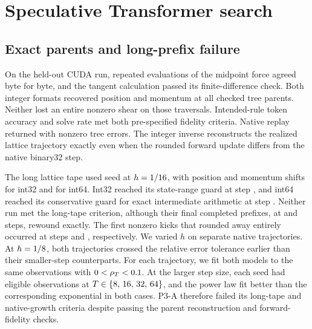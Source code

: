 \section{Speculative Transformer search}
\label{sec:search}

\subsection{Exact parents and long-prefix failure}

On the held-out CUDA run, repeated evaluations of the midpoint
force agreed byte for byte, and the tangent calculation passed
its finite-difference check. Both integer formats recovered
position and momentum at all \PthreeParents{} checked tree
parents. Neither lost an entire nonzero shear on those traversals.
Intended-rule token accuracy and solve rate met both pre-specified
fidelity criteria. Native replay returned with nonzero tree
errors. The integer inverse reconstructs the realized lattice
trajectory exactly even when the rounded forward update differs
from the native binary32 step.

The long lattice tape used seed \PthreeLongSeed{} at
\(h=1/16{}\), with position and momentum shifts
\PthreeIntLowShifts{} for int32 and \PthreeIntHighShifts{} for
int64. Int32 reached its state-range guard at step
\PthreeIntLowGuard{}, and int64 reached its conservative guard
for exact intermediate arithmetic at step \PthreeIntHighGuard{}.
Neither run met the long-tape criterion, although their final
completed prefixes, at \PthreeIntLowPrefix{} and
\PthreeIntHighPrefix{} steps, rewound exactly. The first nonzero
kicks that rounded away entirely occurred at
steps \PthreeIntLowKick{} and \PthreeIntHighKick{}, respectively.
We varied \(h\) on separate native trajectories. At
\(h=1/8{}\), both trajectories crossed the relative
error tolerance \PthreeNativeThreshold{} earlier than their
smaller-step counterparts. For each trajectory, we fit both
models to the same observations with
\(0<\rho_T<\PthreeFitErrorUpper{}\). At the larger step size,
each seed had \PthreeHighFitN{} eligible observations at
\(T\in\{8,\,16,\,32,\,64{}\}\), and the power law fit better
than the corresponding exponential in both cases. P3-A therefore
failed its long-tape and native-growth criteria despite passing
the parent reconstruction and forward-fidelity checks.

\begin{table}[tbp]
  \centering\small
  \caption{Phase~3 native directional stretch and growth fits.
  Threshold crossings are on the registered sampled grid. The
  directional rate uses the reported endpoint \(T=\PthreeRateHorizon{}\).
  The fit sample count includes only errors with
  \(0<\rho_T<\PthreeFitErrorUpper{}\), used by both models.}
  \label{tab:transformer}
  
\end{table}

